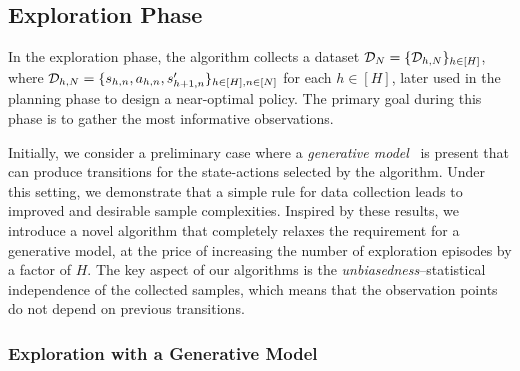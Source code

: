 


\subsection{Exploration Phase} In the exploration phase, the algorithm collects a dataset
$\mathcal{D}_{N}=\{\mathcal{D}_{h,N}\}_{h\in[H]}$, where
$\mathcal{D}_{h,N}=\{s_{h,n},a_{h,n}, s'_{h+1,n}\}_{h\in[H], n\in[N]}$ for each $h\in[H]$, %
later used in the planning phase to design a near-optimal policy. The primary goal during this phase is to gather the most informative observations.

Initially, we consider a preliminary case where a \emph{generative model}~\citep{kakade2003sample} is present that can produce transitions for the state-actions selected by the algorithm. Under this setting, we demonstrate that a simple rule for data collection leads to improved and desirable sample complexities. Inspired by these results, we introduce a novel algorithm that completely relaxes the requirement for a generative model, at the price of increasing the number of exploration episodes by a factor of $H$. The key aspect of our algorithms is the \emph{unbiasedness}--statistical independence of the collected samples, which means that the observation points do not depend on previous transitions.

\subsubsection{Exploration with a Generative Model}

